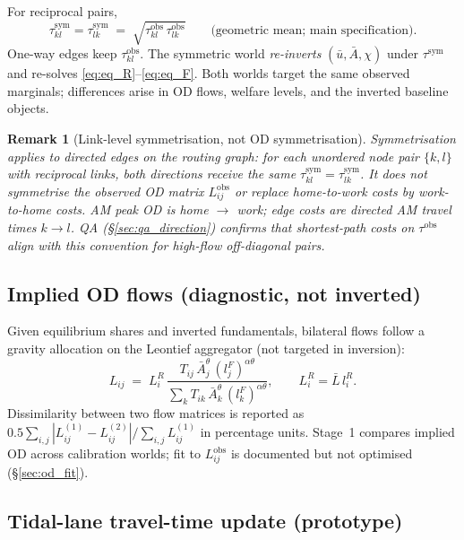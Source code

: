 \documentclass[12pt]{article}
\newtheorem{remark}{Remark}
\newcommand{\Lbar}{\bar L}
\newcommand{\ubar}{\bar u}
\newcommand{\Abar}{\bar A}
\newcommand{\obs}{\mathrm{obs}}
\newcommand{\sym}{\mathrm{sym}}
\begin{document}
For reciprocal pairs,
\begin{equation}
  \tau^{\sym}_{kl}=\tau^{\sym}_{lk}
  \;=\;
  \sqrt{\tau^{\obs}_{kl}\,\tau^{\obs}_{lk}}
  \qquad\text{(geometric mean; main specification)}.
  \label{eq:sym_geometric}
\end{equation}
One-way edges keep $\tau^{\obs}_{kl}$.
The symmetric world \emph{re-inverts} $(\ubar,\Abar,\chi)$ under $\tau^{\sym}$ and
re-solves \eqref{eq:eq_R}--\eqref{eq:eq_F}.
Both worlds target the same observed marginals; differences arise in OD flows, welfare
levels, and the inverted baseline objects.

\begin{remark}[Link-level symmetrisation, not OD symmetrisation]
Symmetrisation applies to \emph{directed edges} on the routing graph: for each unordered
node pair $\{k,l\}$ with reciprocal links, both directions receive the same
$\tau^{\sym}_{kl}=\tau^{\sym}_{lk}$.
It does \emph{not} symmetrise the observed OD matrix $L^{\obs}_{ij}$ or replace
home-to-work costs by work-to-home costs.
AM peak OD is home $\to$ work; edge costs are directed AM travel times $k\to l$.
QA (\S\ref{sec:qa_direction}) confirms that shortest-path costs on $\tau^{\obs}$ align
with this convention for high-flow off-diagonal pairs.
\end{remark}

\subsection{Implied OD flows (diagnostic, not inverted)}\label{sec:od_gravity}

Given equilibrium shares and inverted fundamentals, bilateral flows follow a gravity
allocation on the Leontief aggregator (not targeted in inversion):
\begin{equation}
  L_{ij}
  \;=\;
  L_i^R\,
  \frac{
    T_{ij}\,\Abar_j^{\theta}\,(l_j^F)^{\alpha\theta}
  }{
    \sum_k T_{ik}\,\Abar_k^{\theta}\,(l_k^F)^{\alpha\theta}
  },
  \qquad L_i^R = \Lbar\, l_i^R.
  \label{eq:od_gravity}
\end{equation}
Dissimilarity between two flow matrices is reported as
$0.5\sum_{i,j}|L_{ij}^{(1)}-L_{ij}^{(2)}|/\sum_{i,j}L_{ij}^{(1)}$ in percentage units.
Stage~1 compares implied OD across calibration worlds; fit to $L^{\obs}_{ij}$ is
documented but not optimised (\S\ref{sec:od_fit}).

\subsection{Tidal-lane travel-time update (prototype)}\label{sec:tidal_bpr}
\end{document}
